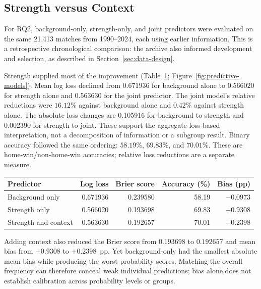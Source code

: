 \subsection{Strength versus Context}
\label{sec:strength-results}

For RQ2, background-only, strength-only, and joint predictors were evaluated on the same 21,413 matches from 1990--2024, each using earlier information. This is a retrospective chronological comparison: the archive also informed development and selection, as described in Section~\ref{sec:data-design}.

Strength supplied most of the improvement (Table~\ref{tab:predictive-models}; Figure~\ref{fig:predictive-models}). Mean log loss declined from $0.671936$ for background alone to $0.566020$ for strength alone and $0.563630$ for the joint predictor. The joint model's relative reductions were $16.12\%$ against background alone and $0.42\%$ against strength alone. The absolute loss changes are 0.105916 for background to strength and 0.002390 for strength to joint. These support the aggregate loss-based interpretation, not a decomposition of information or a subgroup result. Binary accuracy followed the same ordering: $58.19\%$, $69.83\%$, and $70.01\%$. These are home-win/non-home-win accuracies; relative loss reductions are a separate measure.

\begin{table}[htbp]
\centering\small
{}
\label{tab:predictive-models}
\begin{tabular}{lrrrr}
\toprule
Predictor & Log loss & Brier score & Accuracy (\%) & Bias (pp) \\
\midrule
Background only & 0.671936 & 0.239580 & 58.19 & $-0.0973$ \\
Strength only & 0.566020 & 0.193698 & 69.83 & $+0.9308$ \\
Strength and context & 0.563630 & 0.192657 & 70.01 & $+0.2398$ \\
\bottomrule
\end{tabular}
\end{table}

Adding context also reduced the Brier score from $0.193698$ to $0.192657$ and mean bias from $+0.9308$ to $+0.2398$~pp. Yet background-only had the smallest absolute mean bias while producing the worst probability scores. Matching the overall frequency can therefore conceal weak individual predictions; bias alone does not establish calibration across probability levels or groups.

